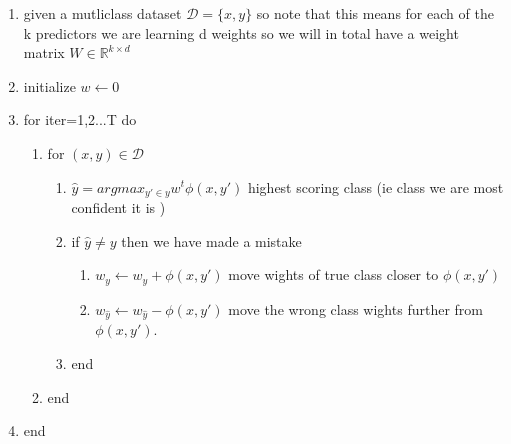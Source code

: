 \documentclass{article}
\begin{document}
\begin{itemize}
\begin{enumerate}
    \item given a mutliclass dataset $\mathcal{D}=\{x,y\}$ so note that this means for each of the k predictors we are learning d weights so we will in total have a weight matrix $W\in \mathbb{R}^{k \times d }$
    \item initialize $w\leftarrow 0$
    \item for iter=1,2...T do
    \begin{enumerate}
        \item for $(x,y)\in \mathcal{D}$
        \begin{enumerate}
        \item $\hat{y}=argmax_{y'\in y}w^t\phi({x,y'})$ highest scoring class (ie class we are most confident it is )
        \item if $\hat{y}\neq y$ then we have made a mistake  
        \begin{enumerate}
            \item $w_{y}\leftarrow w_y+\phi({x,y'})$ move wights of true class closer to $\phi({x,y'})$  
            \item $w_{\hat{y}}\leftarrow w_{\hat{y}}-\phi({x,y'})$ move the wrong class wights further from $\phi({x,y'})$.
        \end{enumerate}
        \item end 
    \end{enumerate}
    \item end 
    \end{enumerate}
    \item end 
\end{enumerate}

\end{itemize}
\end{document}
